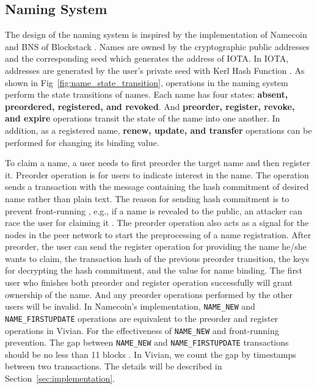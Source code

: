 \subsection{Naming System}
The design of the naming system is inspired by the implementation of Namecoin \cite{kalodner2015empirical} and BNS of Blockstack \cite{ali2017blockstack, ali2016blockstack}.
Names are owned by the cryptographic public addresses and the corresponding seed which generates the address of IOTA. In IOTA, addresses are generated by the user's private seed with Kerl Hash Function \cite{Baek2019IOTAAC}. As shown in Fig~\ref{fig:name_state_transition}, operations in the naming system perform the state transitions of names.
Each name has four states: \textbf{absent, preordered, registered, and revoked}. And \textbf{preorder, register, revoke, and expire} operations transit the state of the name into one another. In addition, as a registered name, \textbf{renew, update, and transfer} operations can be performed for changing its binding value.

To claim a name, a user needs to first preorder the target name and then register it. Preorder operation is for users to indicate interest in the name. The operation sends a transaction with the message containing the hash commitment of desired name rather than plain text. The reason for sending hash commitment is to prevent front-running \cite{kalodner2015empirical}, e.g., if a name is revealed to the public, an attacker can race the user for claiming it \cite{ali2016blockstack}.
The preorder operation also acts as a signal for the nodes in the peer network to start the preprocessing of a name registration.
After preorder, the user can send the register operation for providing the name he/she wants to claim, the transaction hash of the previous preorder transition, the keys for decrypting the hash commitment, and the value for name binding.
The first user who finishes both preorder and register operation successfully will grant ownership of the name.
And any preorder operations performed by the other users will be invalid. In Namecoin's implementation, \texttt{NAME\_NEW} and \texttt{NAME\_FIRSTUPDATE} operations are equivalent to the preorder and register operations in Vivian.
For the effectiveness of \texttt{NAME\_NEW} and front-running prevention. The gap between \texttt{NAME\_NEW} and \texttt{NAME\_FIRSTUPDATE} transactions should be no less than 11 blocks \cite{kalodner2015empirical}. In Vivian, we count the gap by timestamps between two transactions. The details will be described in Section~\ref{sec:implementation}.

